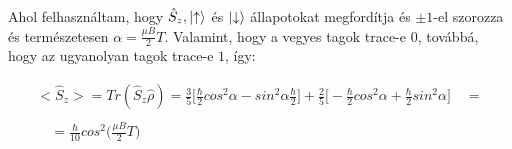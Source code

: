 \documentclass[a4paper,12pt]{article}
\begin{document}
\par Ahol felhasználtam, hogy $\hat{S}_{z}, \ket{\uparrow}$ és $\ket{\downarrow}$ állapotokat megfordítja és $\pm1$-el szorozza és természetesen $\alpha = \frac{\mu B}{2}T$. Valamint, hogy a vegyes tagok trace-e $0$, továbbá, hogy az ugyanolyan tagok trace-e $1$, így:

\begin{equation}
\begin{gathered}
<\hat{S}_{z}> = Tr(\hat{S}_{z}\hat{\rho}) = \frac{3}{5}\Big[ \frac{\hbar}{2}cos^{2}\alpha - sin^{2}\alpha \frac{\hbar}{2} \Big] + \frac{2}{5}\Big[ -\frac{\hbar}{2}cos^{2}\alpha + \frac{\hbar}{2}sin^{2}\alpha\Big] \quad = \\ \\
\quad =  \frac{\hbar}{10}cos^{2}\Big(\frac{\mu B}{2}T\Big)
\end{gathered}
\end{equation}
\end{document}
